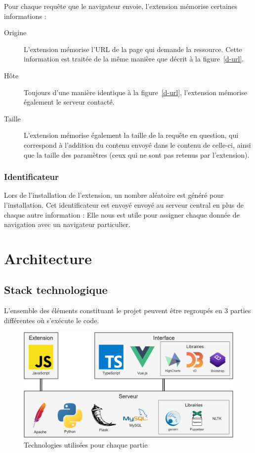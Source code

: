 			Pour chaque requête que le navigateur envoie, l'extension mémorise certaines informations : 
			\begin{description}
				\item[Origine] L'extension mémorise l'URL de la page qui demande la ressource. Cette information est traitée de la même manière que décrit à la figure~\ref{d-url}.
				\item[Hôte] Toujours d'une manière identique à la figure~\ref{d-url}, l'extension mémorise également le serveur contacté.
				\item[Taille] L'extension mémorise également la taille de la requête en question, qui correspond à l'addition du contenu envoyé dans le contenu de celle-ci, ainsi que la taille des paramètres (ceux qui ne sont pas retenus par l'extension).
			\end{description}

		\subsubsection{Identificateur}

			Lors de l'installation de l'extension, un nombre aléatoire est généré pour l'installation. Cet identificateur est envoyé envoyé au serveur central en plus de chaque autre information : Elle nous est utile pour assigner chaque donnée de navigation avec un navigateur particulier.

\section{Architecture}

	\subsection{Stack technologique}

		L'ensemble des éléments constituant le projet peuvent être regroupés en 3 parties différentes où s'exécute le code.

		\begin{figure}[!h]
			\centering
			\includegraphics[width=1\textwidth]{images/design/stack}
			\caption{Technologies utilisées pour chaque partie}
			\label{d-stack}
		\end{figure}

